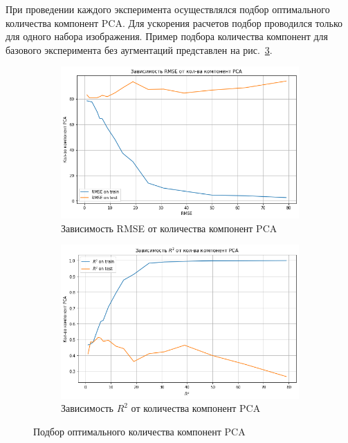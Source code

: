 \documentclass[a4paper,14pt]{article}
\begin{document}
    При проведении каждого эксперимента осуществлялся подбор оптимального количества компонент PCA.
    Для ускорения расчетов подбор проводился только для одного набора изображения.
    Пример подбора количества компонент для базового эксперимента без аугментаций представлен на рис.~\ref{fig:pca_optim}.

    \begin{figure}[H]
        \centering
        \begin{subfigure}{.5\textwidth}
            \centering
            \includegraphics[width=\linewidth]{images/pca_rmse}
            \caption{Зависимость RMSE от количества компонент PCA}
            \label{fig:pca_rmse}
        \end{subfigure}%
        \begin{subfigure}{.5\textwidth}
            \centering
            \includegraphics[width=\linewidth]{images/pca_r2}
            \caption{Зависимость $R^2$ от количества компонент PCA}
            \label{fig:pca_r2}
        \end{subfigure}
        \caption{Подбор оптимального количества компонент PCA}
        \label{fig:pca_optim}
    \end{figure}
\end{document}
